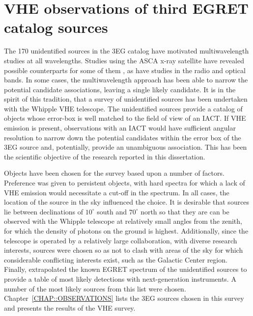 \section{VHE observations of third EGRET catalog sources}
\label{SEC::INTRODUCTION::VHE3EG}

The 170 unidentified sources in the 3EG catalog have motivated
multiwavelength studies at all wavelengths. Studies using the ASCA
x-ray satellite have revealed possible counterparts for some of them
\citep{REF::ROBERTS::APJS2001}, as have studies in the radio and
optical bands. In some cases, the multiwavelength approach has been
able to narrow the potential candidate associations, leaving a single
likely candidate. It is in the spirit of this tradition, that a survey
of unidentified sources has been undertaken with the Whipple VHE \Gray
telescope. The unidentified sources provide a catalog of objects whose
error-box is well matched to the field of view of an IACT. If VHE
emission is present, observations with an IACT would have sufficient
angular resolution to narrow down the potential candidates within the
error box of the 3EG source and, potentially, provide an unambiguous
association. This has been the scientific objective of the research
reported in this dissertation.

Objects have been chosen for the survey based upon a number of
factors. Preference was given to persistent objects, with hard spectra
for which a lack of VHE emission would necessitate a cut-off in the
spectrum. In all cases, the location of the source in the sky
influenced the choice. It is desirable that sources lie between
declinations of $10^\circ$ south and $70^\circ$ north so that they are
can be observed with the Whipple telescope at relatively small angles
from the zenith, for which the density of \Cerenkov photons on the
ground is highest. Additionally, since the telescope is operated by a
relatively large collaboration, with diverse research interests,
sources were chosen so as not to clash with areas of the sky for which
considerable conflicting interests exist, such as the Galactic Center
region. Finally, \citet{REF::PETRY::NUGH2001} extrapolated the known
EGRET spectrum of the unidentified sources to provide a table of most
likely detections with next-generation \Cerenkov instruments. A number
of the most likely sources from this list were
chosen. Chapter~\ref{CHAP::OBSERVATIONS} lists the 3EG sources chosen
in this survey and presents the results of the VHE survey.
